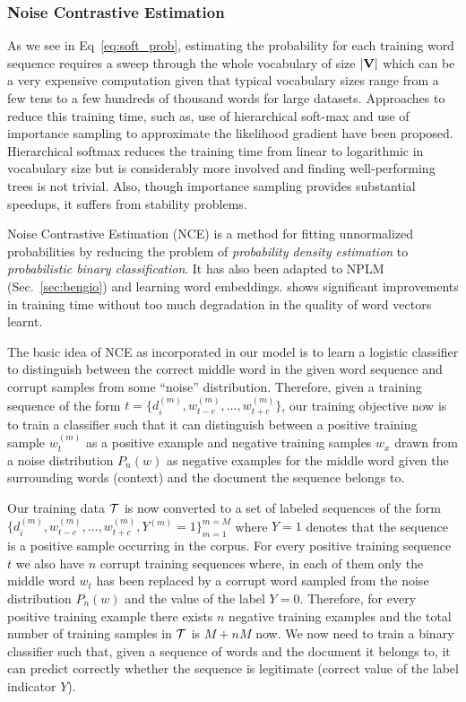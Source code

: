 \subsubsection{Noise Contrastive Estimation}
As we see in Eq~\ref{eq:soft_prob}, estimating the probability for each training word sequence requires a sweep through the whole vocabulary of size $|\mathbf{V}|$ which can be a very expensive computation given that typical vocabulary sizes range from a few tens to a few hundreds of thousand words for large datasets. Approaches to reduce this training time, such as, use of hierarchical soft-max \citep{morin2005hierarchical} and use of importance sampling to approximate the likelihood gradient \citep{bengio2003quick, bengio2008adaptive} have been proposed. 
Hierarchical softmax reduces the training time from linear to logarithmic in vocabulary size but is considerably more involved and finding well-performing trees is not trivial. Also, though importance sampling provides substantial speedups, it suffers from stability problems.

Noise Contrastive Estimation (NCE) \citep{gutmann2012noise} is a method for fitting unnormalized probabilities by reducing the problem of \emph{probability density estimation} to \emph{probabilistic binary classification}. It has also been adapted to NPLM (Sec.~\ref{sec:bengio}) \citep{mnih2012fast} and learning word embeddings. \citet{mnih2013learning} shows significant improvements in training time without too much degradation in the quality of word vectors learnt.

The basic idea of NCE as incorporated in our model is to learn a logistic classifier to distinguish between the correct middle word in the given word sequence and corrupt samples from some ``noise'' distribution. Therefore, given a training sequence of the form $t = \{d^{(m)}_{i}, w^{(m)}_{t-c}, \ldots, w^{(m)}_{t+c}\}$, our training objective now is to train a classifier such that it can distinguish between a positive training sample $w^{(m)}_{t}$ as a positive example and negative training samples $w_{x}$ drawn from a noise distribution $P_{n}(w)$ as negative examples for the middle word given the surrounding words (context) and the document the sequence belongs to.

Our training data $\mathcal{T}$ is now converted to a set of labeled sequences of the form 
$ \{d^{(m)}_{i}, w^{(m)}_{t-c}, \ldots, w^{(m)}_{t+c}, Y^{(m)}=1\}^{m=M}_{m=1} $
where $Y=1$ denotes that the sequence is a positive sample occurring in the corpus. 
For every positive training sequence $t$ we also have $n$ corrupt training sequences where, in each of them only the middle word $w_{t}$ has been replaced by a corrupt word sampled from the noise distribution $P_{n}(w)$ and the value of the label $Y=0$. 
Therefore, for every positive training example there exists $n$ negative training examples and the total number of training samples in $\mathcal{T}$ is $M + nM$ now. 
We now need to train a binary classifier such that, given a sequence of words and the document it belongs to, it can predict correctly whether the sequence is legitimate (correct value of the label indicator $Y$). 

